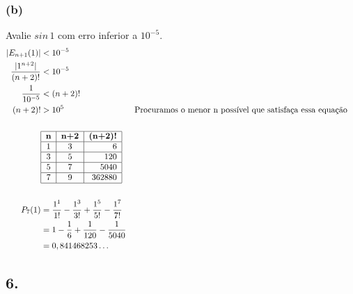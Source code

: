 \documentclass{article}
\begin{document}
\subsubsection{(b)}
Avalie $sin \, 1$ com erro inferior a $10^{-5}$.
\begin{align}
  |E_{n+1}(1)|
  &< 10^{-5} \\
  \frac{|1^{n+2}|}{(n+2)!}
  &< 10^{-5} \notag \\
  \frac{1}{10^{-5}}
  &< (n + 2)! \notag \\
  (n + 2)!
  &> 10^5
  && \text{Procuramos o menor n possível que satisfaça essa equação} \notag \\
  \notag \\
  &
  \begin{tabular}{| c | c | r |}
    \hline
    \textbf{n} & \textbf{n+2} & \textbf{(n+2)!}  \\ \hline
            1  &         3    &            6     \\ \hline
            3  &         5    &          120     \\ \hline
            5  &         7    &         5040     \\ \hline
            7  &         9    &       362880     \\ \hline
  \end{tabular} \notag \\
  \notag \\
  P_7(1)
  &= \frac{1^1}{1!}
  - \frac{1^3}{3!}
  + \frac{1^5}{5!}
  - \frac{1^7}{7!} \\
  &= 1
  - \frac{1}{6}
  + \frac{1}{120}
  - \frac{1}{5040} \notag \\
  &= 0,841468253 \ldots \notag
\end{align}
\setcounter{equation}{0}
\clearpage


\subsection{6.}
\end{document}
